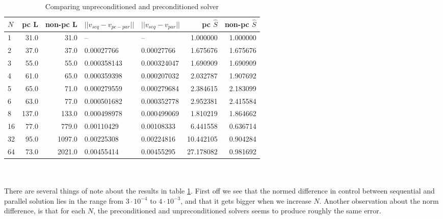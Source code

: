 \begin{table}[h]
\centering
\caption{Comparing unpreconditioned and preconditioned solver}
\label{compare_table}
\begin{tabular}{lrrllrr}
\toprule
{}$N$ &  pc L &  non-pc L &       $||v_{seq}-v_{pc-par}||$ &  $||v_{seq}-v_{par}||$  &  pc $\hat{S}$ &  non-pc $\hat{S}$ \\
\midrule
1  &     31.0 &      31.0 &           -- &           -- &    1.000000 &        1.000000 \\
2  &     37.0 &      37.0 &   0.00027766 &   0.00027766 &    1.675676 &        1.675676 \\
3  &     55.0 &      55.0 &  0.000358143 &  0.000324047 &    1.690909 &        1.690909 \\
4  &     61.0 &      65.0 &  0.000359398 &  0.000207032 &    2.032787 &        1.907692 \\
5  &     65.0 &      71.0 &  0.000279559 &  0.000279684 &    2.384615 &        2.183099 \\
6  &     63.0 &      77.0 &  0.000501682 &  0.000352778 &    2.952381 &        2.415584 \\
8  &    137.0 &     133.0 &  0.000498978 &  0.000499069 &    1.810219 &        1.864662 \\
16 &     77.0 &     779.0 &   0.00110429 &   0.00108333 &    6.441558 &        0.636714 \\
32 &     95.0 &    1097.0 &   0.00225308 &   0.00224816 &   10.442105 &        0.904284 \\
64 &     73.0 &    2021.0 &   0.00455414 &   0.00455295 &   27.178082 &        0.981692 \\
\bottomrule
\end{tabular}
\end{table}
\\
\\
There are several things of note about the results in table \ref{compare_table}. First off we see that the normed difference in control between sequential and parallel solution lies in the range from $3\cdot 10^{-4}$ to $4\cdot 10^{-3}$, and that it gets bigger when we increase $N$. Another observation about the norm difference, is that for each $N$, the preconditioned and unpreconditioned solvers seems to produce roughly the same error. 
\\
\\
